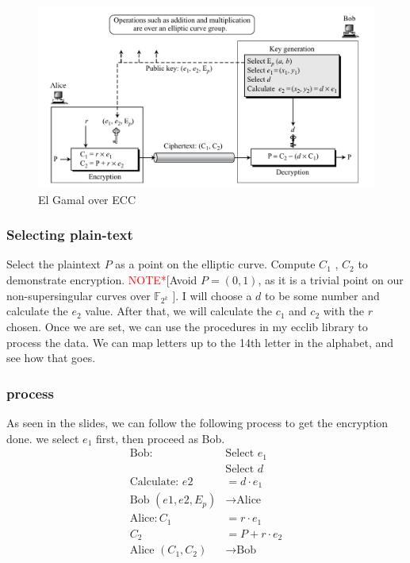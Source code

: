 \documentclass[a4paper,11pt]{exam}
\begin{document}
\begin{center}
\begin{figure}[h]
    \centering
    \includegraphics[width=16cm]{./images/fig1_hw3.png}
    \caption{El Gamal over ECC}
    \label{fig:fig1_hw3}
  \end{figure}
\end{center}

\subsubsection{Selecting plain-text}
\label{sec:org791f081}
Select the plaintext \(P\) as a point on the elliptic curve. Compute \(C_1\) , \(C_2\) to demonstrate encryption. \textcolor{red}{NOTE*}[Avoid \(P = (0, 1)\), as it is a trivial point on our non-supersingular curves over \(\mathbb{F}_{2^k}\) ].
I will choose a \(d\) to be some number and calculate the \(e_2\) value. After that, we will calculate the \(c_1\) and \(c_2\) with the \(r\) chosen. Once we are set, we can use the procedures in my ecclib library to process the data. We can map letters up to the 14th letter in the alphabet, and see how that goes.

\subsubsection{process}
\label{sec:orgd42152d}
\noindent
As seen in the slides, we can follow the following process to get the encryption done. we select \(e_1\) first, then proceed as Bob.
\begin{align*}
\text{Bob} : &\text{Select }e_1\\
&\text{Select }d\\
\text{Calculate: }e2 &= d\cdot e_1\\
\text{Bob }(e1,e2,E_p) &\xrightarrow{}\text{Alice}\\
\text{Alice} : C_1 &= r\cdot e_1\\
C_2 &= P + r\cdot e_2\\
\text{Alice }(C_1, C_2) &\xrightarrow{}\text{Bob}
\end{align*}
\end{document}
